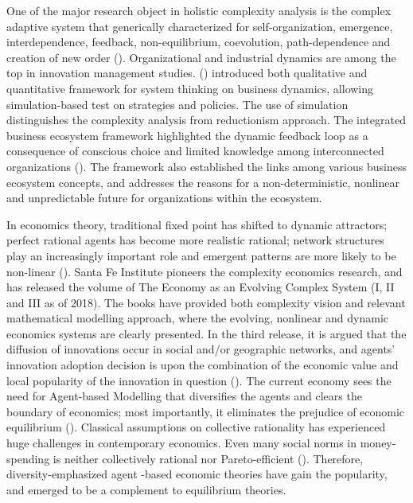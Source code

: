 \documentclass[utf8,english]{gradu3}
\begin{document}
One of the major research object in holistic complexity analysis is the complex adaptive system that generically characterized for self-organization, emergence, interdependence, feedback, non-equilibrium, coevolution, path-dependence and creation of new order (\cite{mitleton2003complex}). Organizational and industrial dynamics are among the top in innovation management studies. \citeauthor{jung2014structure} (\citeyear{jung2014structure}) introduced both qualitative and quantitative framework for system thinking on business dynamics, allowing simulation-based test on strategies and policies. The use of simulation distinguishes the complexity analysis from reductionism approach. The integrated business ecosystem framework highlighted the dynamic feedback loop as a consequence of conscious choice and limited knowledge among interconnected organizations (\cite{peltoniemi2006preliminary}). The framework also established the links among various business ecosystem concepts, and addresses the reasons for a non-deterministic, nonlinear and unpredictable future for organizations within the ecosystem.

In economics theory, traditional fixed point has shifted to dynamic attractors; perfect rational agents has become more realistic rational; network structures play an increasingly important role and emergent patterns are more likely to be non-linear (\cite{beinhocker2006origin}). Santa Fe Institute pioneers the complexity economics research, and has released the volume of The Economy as an Evolving Complex System (I, II and III as of 2018). The books have provided both complexity vision and relevant mathematical modelling approach, where the evolving, nonlinear and dynamic economics systems are clearly presented. In the third release, it is argued that the diffusion of innovations occur in social and/or geographic networks, and agents' innovation adoption decision is upon the combination of the economic value and local popularity of the innovation in question (\cite{young2006diffusion}). The current economy sees the need for Agent-based Modelling that diversifies the agents and clears the boundary of economics; most importantly, it eliminates the prejudice of economic equilibrium (\cite{farmer2009economy}). Classical assumptions on collective rationality has experienced huge challenges in contemporary economics. Even many social norms  in money-spending is neither collectively rational nor Pareto-efficient (\cite{elster1989social}). Therefore, diversity-emphasized agent -based economic theories have gain the popularity, and emerged to be a complement to equilibrium theories. 
\end{document}
